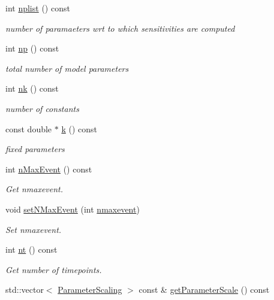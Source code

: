 \begin{DoxyCompactItemize}
\item 
int \mbox{\hyperlink{classamici_1_1_model_a0f8e994055e37954d7746f3c1af27a5c}{nplist}} () const
\begin{DoxyCompactList}\small\item\em number of paramaeters wrt to which sensitivities are computed \end{DoxyCompactList}\item 
int \mbox{\hyperlink{classamici_1_1_model_ae296546c9fd4d7c4ad3b7000aa9e22ef}{np}} () const
\begin{DoxyCompactList}\small\item\em total number of model parameters \end{DoxyCompactList}\item 
int \mbox{\hyperlink{classamici_1_1_model_a3d4130da64883565a06a86e7d6029da1}{nk}} () const
\begin{DoxyCompactList}\small\item\em number of constants \end{DoxyCompactList}\item 
const double $\ast$ \mbox{\hyperlink{classamici_1_1_model_adde50e0d8a99d20354c8403bf93fab6f}{k}} () const
\begin{DoxyCompactList}\small\item\em fixed parameters \end{DoxyCompactList}\item 
int \mbox{\hyperlink{classamici_1_1_model_ac6ea00eafac9ec7be198bca04b19f4c3}{n\+Max\+Event}} () const
\begin{DoxyCompactList}\small\item\em Get nmaxevent. \end{DoxyCompactList}\item 
void \mbox{\hyperlink{classamici_1_1_model_a35f06fdd341805405b851788ffe981c4}{set\+N\+Max\+Event}} (int \mbox{\hyperlink{classamici_1_1_model_aff0f3f25d886279a90dbf0571956885c}{nmaxevent}})
\begin{DoxyCompactList}\small\item\em Set nmaxevent. \end{DoxyCompactList}\item 
int \mbox{\hyperlink{classamici_1_1_model_a4c23d300cbe15b0afb1ee3731d47cc93}{nt}} () const
\begin{DoxyCompactList}\small\item\em Get number of timepoints. \end{DoxyCompactList}\item 
std\+::vector$<$ \mbox{\hyperlink{namespaceamici_a42f062082226e9284c201d9eab71a3a0}{Parameter\+Scaling}} $>$ const  \& \mbox{\hyperlink{classamici_1_1_model_ab14620b22a79748a09a88b9311a7f6d5}{get\+Parameter\+Scale}} () const

\end{DoxyCompactItemize}
